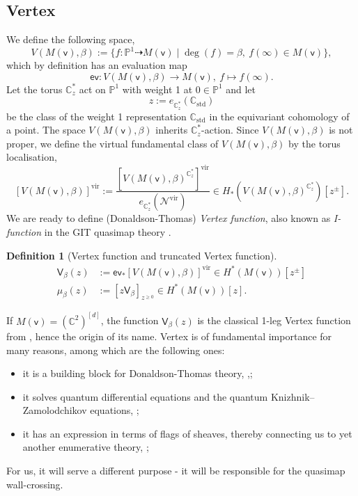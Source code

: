 \documentclass[11pt, reqno]{amsart}
\theoremstyle{plain}
\theoremstyle{definition}
\newtheorem{defn}[thm]{Definition}
\theoremstyle{remark}
\newcommand{\BC}{{\mathbb{C}}}
\newcommand{\CN}{{\mathcal N}}
\newcommand{\vsf}{{\mathsf{v}}}
\newcommand{\p}{\mathbb{P}}
\newcommand{\evsf}{{\mathsf{ev}}}
\begin{document}
\subsection{Vertex}  We define the following space, 
\[ V(M(\vsf), \beta) := \{ f \colon \p^1 \dasharrow M(\vsf) \mid \deg(f)=\beta, \ f(\infty) \in M(\vsf)\},\] 
which by definition has an evaluation map 
\[ \evsf \colon  V(M(\vsf),\beta) \rightarrow M(\vsf), \ f \mapsto f(\infty).\]
 Let the torus $\BC_z^*$ act on $\p^1$ with weight 1 at $0\in \p^1$ and let 
\[ z:= e_{\BC_z^*}(\BC_{\mathrm{std}}) \]
be the class of the weight 1 representation $\BC_{\mathrm{std}}$ in the equivariant cohomology of a point. 
 The space  $V(M(\vsf),\beta)$ inherits $\BC_z^*$-action. Since $V(M(\vsf),\beta)$ is not proper, we define the virtual fundamental class of $V(M(\vsf),\beta)$ by the torus localisation, 
\[[V(M(\vsf),\beta)]^{\mathrm{vir}}:=\frac{[V(M(\vsf),\beta)^{\BC_z^*}]^{\mathrm{vir}} }{e_{\BC_z^*}(\CN^{\mathrm{vir}})}\in H_{*}(V(M(\vsf),\beta)^{\BC_z^*})[z^\pm].\]
We are ready to define (Donaldson-Thomas) \textit{Vertex function}, also known as \textit{I-function} in the GIT quasimap theory . 
\begin{defn}[Vertex function and truncated Vertex function] \
	\begin{align*}
		\mathsf{V}_\beta(z)&:= \evsf_* [V(M(\vsf),\beta)]^{\mathrm{vir}} \in H^*(M(\vsf))[z^\pm] \\
	 \mu_{\beta}(z)&:=[z\mathsf{V}_\beta]_{z^{\geq 0}}  \in H^*(M(\vsf))[z].
	\end{align*}
	\end{defn}
If $M(\vsf)=(\BC^2)^{[d]}$, the function $\mathsf{V}_\beta(z)$ is the classical 1-leg Vertex function from \cite{MNOP1, MNOP}, hence the origin of its name. Vertex is of fundamental importance for many reasons, among which are the following ones:
\begin{itemize}
\item  it is a building block for Donaldson-Thomas theory, \cite{MOOP},\cite{AKMV};
\item  it solves quantum differential equations and the quantum Knizhnik–Zamolodchikov equations, \cite{MO};
 \item it has an expression in terms of flags of sheaves, thereby connecting us to yet  another enumerative theory, \cite{Ob};
 \end{itemize}
 


For us, it will serve a different purpose - it will be responsible for the quasimap wall-crossing. 
\end{document}
